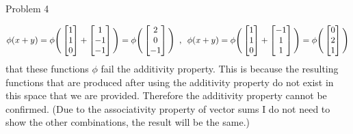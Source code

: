 \begin{problem}{Problem 4}
\begin{Highlight}[Solution]
        \setcounter{equation}{0}
        \begin{equation}
            \phi(x + y) = \phi \Bigg(
                \begin{bmatrix}
                    1 \\
                    1 \\
                    0 \\
                \end{bmatrix}
                + 
                \begin{bmatrix}
                    1 \\
                    -1 \\
                    -1 \\
                \end{bmatrix}
                \Bigg) = \phi \Bigg(
                \begin{bmatrix}
                    2 \\
                    0 \\
                    -1 \\
                \end{bmatrix}
                \Bigg) \hspace*{5pt} , \hspace*{5pt}
            \phi(x + y) = \phi \Bigg(
                \begin{bmatrix}
                    1 \\
                    1 \\
                    0 \\
                \end{bmatrix}
                +
                \begin{bmatrix}
                    -1 \\
                    1 \\
                    1 \\
                \end{bmatrix}
                \Bigg) = \phi \Bigg(
                \begin{bmatrix}
                    0 \\
                    2 \\
                    1 \\
                \end{bmatrix}
                \Bigg)
        \end{equation}
        that these functions $\phi$ fail the additivity property. This is because the resulting functions that are produced after using the additivity property do not exist in this space that we are 
        provided. Therefore the additivity property cannot be confirmed. (Due to the associativity property of vector sums I do not need to show the other combinations, the result will be the same.)


\end{Highlight}
\end{problem}

